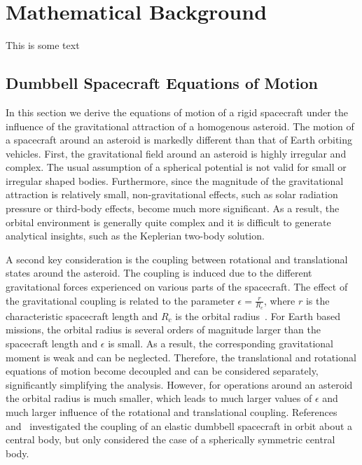 
\chapter{Mathematical Background}
This is some text
\section{Dumbbell Spacecraft Equations of Motion}\label{sec:dumbbell}

In this section we derive the equations of motion of a rigid spacecraft under the influence of the gravitational attraction of a homogenous asteroid.
The motion of a spacecraft around an asteroid is markedly different than that of Earth orbiting vehicles.
First, the gravitational field around an asteroid is highly irregular and complex. 
The usual assumption of a spherical potential is not valid for small or irregular shaped bodies.
Furthermore, since the magnitude of the gravitational attraction is relatively small, non-gravitational effects, such as solar radiation pressure or third-body effects, become much more significant.
As a result, the orbital environment is generally quite complex and it is difficult to generate analytical insights, such as the Keplerian two-body solution.

A second key consideration is the coupling between rotational and translational states around the asteroid.
The coupling is induced due to the different gravitational forces experienced on various parts of the spacecraft.
The effect of the gravitational coupling is related to the parameter \(\epsilon = \frac{r}{R_c}\), where \(r\) is the characteristic spacecraft length and \(R_c\) is the orbital radius~\cite{hughes2004}.
For Earth based missions, the orbital radius is several orders of magnitude larger than the spacecraft length and \(\epsilon\) is small.
As a result, the corresponding gravitational moment is weak and can be neglected. 
Therefore, the translational and rotational equations of motion become decoupled and can be considered separately, significantly simplifying the analysis. 
However, for operations around an asteroid the orbital radius is much smaller, which leads to much larger values of \(\epsilon\) and much larger influence of the rotational and translational coupling.
References~\cite{elmasri2005} and~\cite{sanyal2004} investigated the coupling of an elastic dumbbell spacecraft in orbit about a central body, but only considered the case of a spherically symmetric central body.

